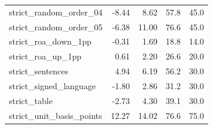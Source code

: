 {\begin{longtable}{@{}p{}rrrr@{}}
strict\_random\_order\_04 & -8.44 & 8.62 & 57.8 & 45.0 \\
strict\_random\_order\_05 & -6.38 & 11.00 & 76.6 & 45.0 \\
strict\_roa\_down\_1pp & -0.31 & 1.69 & 18.8 & 14.0 \\
strict\_roa\_up\_1pp & 0.61 & 2.20 & 26.6 & 20.0 \\
strict\_sentences & 4.94 & 6.19 & 56.2 & 30.0 \\
strict\_signed\_language & -1.80 & 2.86 & 31.2 & 30.0 \\
strict\_table & -2.73 & 4.30 & 39.1 & 30.0 \\
strict\_unit\_basis\_points & 12.27 & 14.02 & 76.6 & 75.0 \\
\bottomrule
\end{longtable}}
